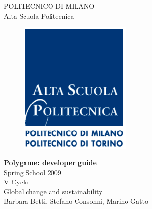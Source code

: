 \thispagestyle{empty}
\vspace*{-1.5cm} 
\begin{center}
  \large
  POLITECNICO DI MILANO\\
  \normalsize
  Alta Scuola Politecnica\\
  \begin{figure}[htbp]
    \begin{center}
      \includegraphics[width=5.5cm]{../img/logoasp.png}
    \end{center}
  \end{figure}
  \vspace*{0.3cm} \LARGE



  \textbf{Polygame: developer guide}\\



  \vspace*{.75truecm} \large
  Spring School 2009 \\
  V Cycle \\
  Global change and sustainability\\
  Barbara Betti, Stefano Consonni, Marino Gatto
  
\end{center}
\vspace*{2.0cm} \large
\begin{flushleft}



\end{flushleft}
